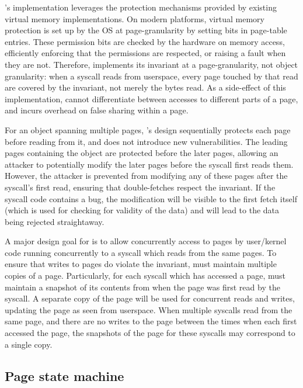 \documentclass[letterpaper,twocolumn,10pt, anonymous]{article}
\begin{document}
\tiktok's implementation leverages the protection mechanisms provided by 
existing virtual memory implementations. 
On modern platforms, virtual memory protection is set up by the OS at
page-granularity by setting bits in page-table entries.
These permission bits are checked by the hardware on memory access, 
efficiently enforcing that the permissions are respected, or raising 
a fault when they are not.
Therefore, \tiktok implements its invariant at a page-granularity, not object 
granularity: when a syscall reads from userspace, every page touched by that 
read are covered by the invariant, not merely the bytes read.
As a side-effect of this implementation, \tiktok cannot differentiate between
accesses to different parts of a page, and incurs overhead on false sharing
within a page.

For an object spanning multiple pages, \tiktok's design sequentially 
protects each page before reading from it, and does not introduce 
new vulnerabilities. 
The leading pages containing the object are protected before the
later pages, allowing an attacker to potentially modify the later 
pages before the syscall first reads them.
However, the attacker is prevented from modifying any of these pages
after the syscall's first read, ensuring that double-fetches respect
the invariant.
If the syscall code contains a \tocttou bug, the modification will
be visible to the first fetch itself (which is used for checking for 
validity of the data) and will lead to the data being rejected 
straightaway.

A major design goal for \tiktok is to allow concurrently access to pages
by user/kernel code running concurrently to a syscall which reads from 
the same pages.
To ensure that writes to pages do violate the invariant, \tiktok
must maintain multiple copies of a page.
Particularly, for each syscall which has accessed a page, \tiktok
must maintain a snapshot of its contents from when the page was first 
read by the syscall.
A separate copy of the page will be used for concurrent reads and writes,
updating the page as seen from userspace.
When multiple syscalls read from the same page, and there are no writes
to the page between the times when each first accessed the page, 
the snapshots of the page for these syscalls may correspond to a 
single copy.

\subsection{Page state machine}
\end{document}
